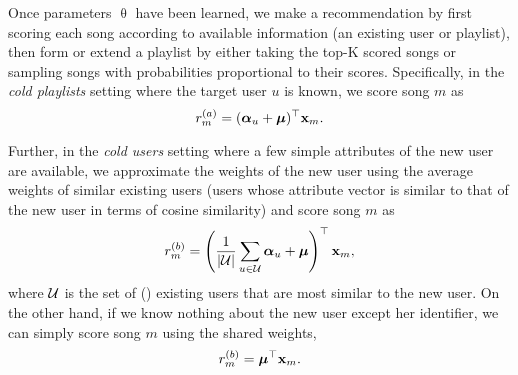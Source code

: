 Once parameters $\uptheta$ have been learned, 
we make a recommendation by first scoring each song according to available information (\eg an existing user or playlist),
then form or extend a playlist by either taking the top-K scored songs or sampling songs with probabilities proportional to their scores.
%
Specifically, %
in the \emph{cold playlists} setting where the target user $u$ is known,
we score song $m$ as 
\begin{equation}
\label{eq:cp}
r_m^{(a)} = ({\bm{\alpha}}_u + \bm{\mu})^\top \mathbf{x}_m.
\end{equation}

Further, in the \emph{cold users} setting where a few simple attributes of the new user are available,
we approximate the weights of the new user using the average weights of similar existing users
(\eg users whose attribute vector is similar to that of the new user in terms of cosine similarity)
and score song $m$ as
\vspace{-1.5em}
\begin{equation}
\label{eq:cu}
r_m^{(b)} = \left( \frac{1}{|\mathcal{U}|} \sum_{u \in \mathcal{U}} {\bm{\alpha}}_u + \bm{\mu} \right)^\top \mathbf{x}_m,
\end{equation}
where $\mathcal{U}$ is the set of () existing users that are most similar to the new user.
On the other hand, if we know nothing about the new user except her identifier,
we can simply score song $m$ using the shared weights, \ie
\vspace{-.3em}
\begin{equation}
\label{eq:cu2}
r_m^{(b)} = \bm{\mu}^\top \mathbf{x}_m.
\end{equation}


